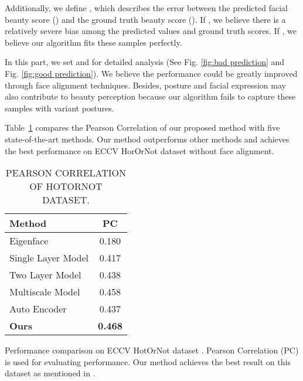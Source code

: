 \documentclass[a4paper,conference]{IEEEtran}
\begin{document}
    Additionally, we define , which describes the error
    between the predicted facial beauty score () and the ground truth
    beauty score (). If , we believe there is a relatively
    severe bias among the predicted values and ground truth scores. If
    , we believe our algorithm fits these samples perfectly.

    In this part, we set  and  for detailed analysis
    (See Fig. \ref{fig:bad prediction} and Fig. \ref{fig:good prediction}).
    We believe the performance could be greatly improved through face alignment
    techniques. Besides, posture and facial expression may also contribute to
    beauty perception because our algorithm fails to capture these samples with
    variant postures.

    Table~\ref{tb:PC} compares the Pearson Correlation of our proposed method
    with five state-of-the-art methods. Our method outperforms other methods and
    achieves the best performance on ECCV HorOrNot dataset without face alignment.

    \begin{table}[!htb]
      \caption{PEARSON CORRELATION OF HOTORNOT DATASET.}
      \label{eccv performance comparison}
      \begin{center}
        \begin{tabular}{l|c}
          \hline
          \textbf{Method} &  \textbf{PC} \\ \hline\hline
          Eigenface & 0.180 \\
          Single Layer Model & 0.417 \\
          Two Layer Model & 0.438 \\
          Multiscale Model \cite{gray2010predicting} & 0.458 \\
          Auto Encoder \cite{wang2014attractive} & 0.437 \\
          \textbf{{Ours}} & \textbf{{0.468}} \\ \hline
        \end{tabular}
        \begin{tablenotes}
          \footnotesize
          Performance comparison on ECCV HotOrNot dataset
          \cite{gray2010predicting}.
          Pearson Correlation (PC) is used for evaluating performance.
          Our method achieves the best result on this dataset as mentioned in
          \cite{gray2010predicting}.
        \end{tablenotes}
      \end{center}\label{tb:PC}
    \end{table}
\end{document}
